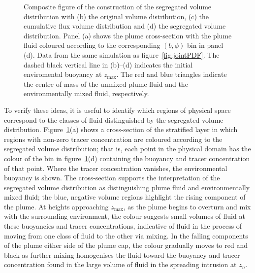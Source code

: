 \documentclass[a4paper]{article}
\begin{document}
\begin{figure}
	\centering
	\caption{Composite figure of the construction of the segregated volume distribution with (b) the original
	volume distribution, (c) the cumulative flux volume distribution and (d) the segregated volume
	distribution. Panel (a) shows the plume cross-section with the plume fluid coloured according to the
	corresponding $(b, \phi)$ bin in panel (d).  Data from the same simulation as figure~\ref{fig:jointPDF}.
	The dashed black vertical line in (b)--(d) indicates the initial enviromental buoyancy at $z_{\max}$. The
	red and blue triangles indicate the centre-of-mass of the unmixed plume fluid and the environmentally
	mixed fluid, respectively.}
	\label{fig:modPDF}
\end{figure}

To verify these ideas, it is useful to identify which regions of physical space correspond to
the classes of fluid distinguished by the segregated volume distribution. Figure~\ref{fig:modPDF}(a) shows a
cross-section of the stratified layer in which regions with non-zero tracer concentration are coloured
according to the segregated volume distribution; that is, each point in the physical domain has the colour of
the bin in figure~\ref{fig:modPDF}(d) containing the buoyancy and tracer concentration of that point. Where
the tracer concentration vanishes, the environmental buoyancy is shown. The cross-section supports the
interpretation of the segregated volume distribution as distinguishing plume fluid and environmentally mixed
fluid; the blue, negative volume regions highlight the rising component of the plume. At heights approaching
$z_{\max}$, as the plume begins to overturn and mix with the surrounding environment, the colour suggests
small volumes of fluid at these buoyancies and tracer concentrations, indicative of fluid in the process of
moving from one class of fluid to the other via mixing. In the falling components of the plume either side of
the plume cap, the colour gradually moves to red and black as further mixing homogenises the fluid toward the
buoyancy and tracer concentration found in the large volume of fluid in the spreading intrusion at $z_n$.  
\end{document}
